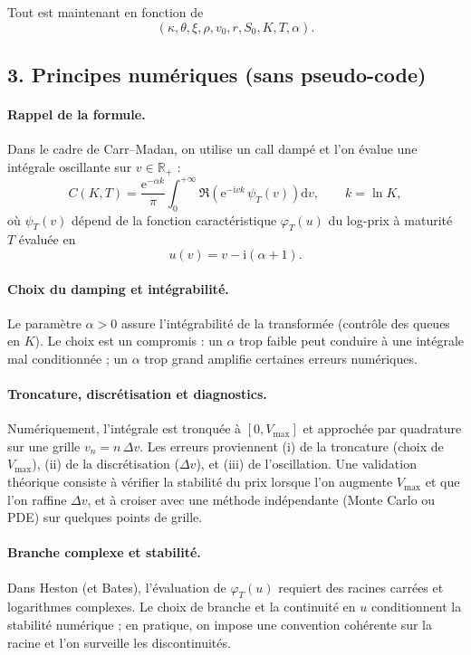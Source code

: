 \documentclass[11pt,a4paper]{article}
\newcommand{\dd}{\mathrm{d}}
\newcommand{\ee}{\mathrm{e}}
\newcommand{\ii}{\mathrm{i}}
\newcommand{\R}{\mathbb{R}}
\newcommand{\1}{\mathbf{1}}
\begin{document}
Tout est maintenant en fonction de
\[
(\kappa,\theta,\xi,\rho,v_0,r,S_0,K,T,\alpha).
\]

\subsection*{3. Principes num\'eriques (sans pseudo-code)}

\paragraph{Rappel de la formule.}
Dans le cadre de Carr--Madan, on utilise un call damp\'e et l'on \'evalue une int\'egrale oscillante sur $v\in\R_+$ :
\[
C(K,T)
=
\frac{\ee^{-\alpha k}}{\pi}\int_0^{+\infty}\Re\!\left(\ee^{-\ii v k}\,\psi_T(v)\right)\dd v,
\qquad
k=\ln K,
\]
o\`u $\psi_T(v)$ d\'epend de la fonction caract\'eristique $\varphi_T(u)$ du log-prix \`a maturit\'e $T$ \'evalu\'ee en
\[
u(v)=v-\ii(\alpha+1).
\]

\paragraph{Choix du damping et int\'egrabilit\'e.}
Le param\`etre $\alpha>0$ assure l'int\'egrabilit\'e de la transform\'ee (contr\^ole des queues en $K$). Le choix est un compromis :
un $\alpha$ trop faible peut conduire \`a une int\'egrale mal conditionn\'ee ; un $\alpha$ trop grand amplifie certaines erreurs num\'eriques.

\paragraph{Troncature, discr\'etisation et diagnostics.}
Num\'eriquement, l'int\'egrale est tronqu\'ee \`a $[0,V_{\max}]$ et approch\'ee par quadrature sur une grille $v_n=n\,\Delta v$.
Les erreurs proviennent (i) de la troncature (choix de $V_{\max}$), (ii) de la discr\'etisation ($\Delta v$), et (iii) de l'oscillation.
Une validation th\'eorique consiste \`a v\'erifier la stabilit\'e du prix lorsque l'on augmente $V_{\max}$ et que l'on raffine $\Delta v$,
et \`a croiser avec une m\'ethode ind\'ependante (Monte Carlo ou PDE) sur quelques points de grille.

\paragraph{Branche complexe et stabilit\'e.}
Dans Heston (et Bates), l'\'evaluation de $\varphi_T(u)$ requiert des racines carr\'ees et logarithmes complexes. Le choix de branche
et la continuit\'e en $u$ conditionnent la stabilit\'e num\'erique ; en pratique, on impose une convention coh\'erente sur la racine
et l'on surveille les discontinuit\'es.
\end{document}
